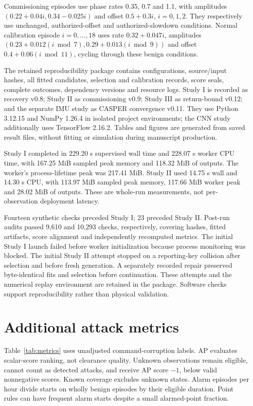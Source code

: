 \documentclass[11pt]{article}
\begin{document}
Commissioning episodes use phase rates 0.35, 0.7 and 1.1, with amplitudes $(0.22+0.04i,0.34-0.025i)$ and offset $0.5+0.3i$, $i=0,1,2$. They respectively use unchanged, authorized-offset and authorized-slowdown conditions. Normal calibration episode $i=0,\ldots,18$ uses rate $0.32+0.047i$, amplitudes $(0.23+0.012(i\bmod7),0.29+0.013(i\bmod9))$ and offset $0.4+0.06(i\bmod11)$, cycling through these benign conditions.

The retained reproducibility package contains configurations, source/input hashes, all fitted candidates, selection and calibration records, score seals, complete outcomes, dependency versions and resource logs. Study I is recorded as recovery v0.8; Study II as commissioning v0.9; Study III as return-bound v0.12; and the separate IMU study as CASPER convergence v0.11. They use Python 3.12.15 and NumPy 1.26.4 in isolated project environments; the CNN study additionally uses TensorFlow 2.16.2. Tables and figures are generated from saved result files, without fitting or simulation during manuscript production.

Study I completed in 229.20 s supervised wall time and 228.07 s worker CPU time, with 167.25 MiB sampled peak memory and 118.32 MiB of outputs. The worker's process-lifetime peak was 217.41 MiB. Study II used 14.75 s wall and 14.30 s CPU, with 113.97 MiB sampled peak memory, 117.66 MiB worker peak and 28.02 MiB of outputs. These are whole-run measurements, not per-observation deployment latency.

Fourteen synthetic checks preceded Study I; 23 preceded Study II. Post-run audits passed 9,610 and 10,293 checks, respectively, covering hashes, fitted artifacts, score alignment and independently recomputed metrics. The initial Study I launch failed before worker initialization because process monitoring was blocked. The initial Study II attempt stopped on a reporting-key collision after selection and before fresh generation. A separately recorded repair preserved byte-identical fits and selection before continuation. These attempts and the numerical replay environment are retained in the package. Software checks support reproducibility rather than physical validation.



\section{Additional attack metrics}\label{app:metrics}
Table~\ref{tab:metrics} uses unadjusted command-corruption labels. AP evaluates scalar-score ranking, not clearance quality. Unknown observations remain eligible, cannot count as detected attacks, and receive AP score $-1$, below valid nonnegative scores. Known coverage excludes unknown states. Alarm episodes per hour divide starts on wholly benign episodes by their eligible duration. Point rules can have frequent alarm starts despite a small alarmed-point fraction.
\end{document}
